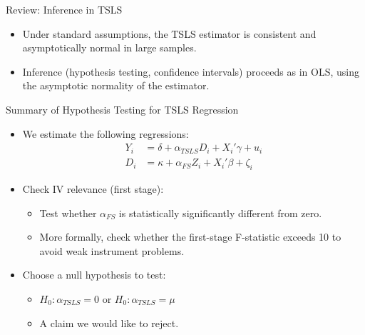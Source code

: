 \documentclass[dvipsnames,hyperref={pdfpagelabels=false}]{beamer}
\begin{document}
\begin{frame}{Review: Inference in TSLS}
	\begin{itemize}
		\item Under standard assumptions, the TSLS estimator is consistent and asymptotically normal in large samples.
		\vspace{0.3cm}
		\item Inference (hypothesis testing, confidence intervals) proceeds as in OLS, using the asymptotic normality of the estimator.
	\end{itemize}
\end{frame}





\begin{frame}{Summary of Hypothesis Testing for TSLS Regression}
	\begin{itemize}
		\item We estimate the following regressions:
		\begin{equation*}
			\begin{aligned}
				Y_i &= \delta + \alpha_{TSLS} D_i +  X_i' \gamma + u_{i}  \\
				D_i &=  \kappa + \alpha_{FS} Z_i +  X_i' \beta + \zeta_i  
			\end{aligned}
		\end{equation*}
		\item[1.] Check IV relevance (first stage):
		\begin{itemize}
			\vspace{0.2cm}
			\item Test whether $\alpha_{FS}$ is statistically significantly different from zero.
						\vspace{0.2cm}
			\item More formally, check whether the first-stage F-statistic exceeds 10 to avoid weak instrument problems.
						\vspace{0.2cm}
		\end{itemize}
		\item[2.] Choose a null hypothesis to test:
		\begin{itemize}
			\vspace{0.2cm}
			\item $H_0: \alpha_{TSLS} = 0$ or $H_0: \alpha_{TSLS} = \mu$
						\vspace{0.2cm}
			\item A claim we would like to reject.
		\end{itemize}
	\end{itemize}
\end{frame}
\end{document}
